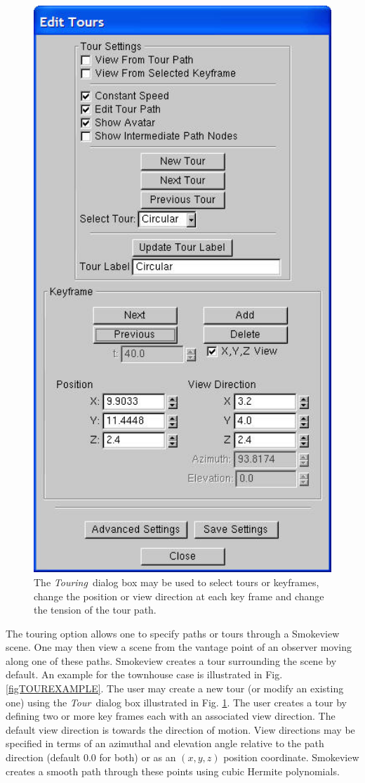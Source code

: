 \documentclass[11pt,twoside]{book}
\begin{document}
\begin{figure}[\figoptions]
\begin{center}
\includegraphics[width=4.4722222in]{FIGURES/figTOUR}
\end{center}
\caption[{\em Touring}\ dialog box.]{The {\em Touring}\ dialog
box may be used to select tours or keyframes, change the
position or view direction at each key frame and change the tension
of the tour path. }
 \label{figTOUR}
\end{figure}

The touring option allows one to specify paths or tours through a
Smokeview scene.  One may then view a scene from the vantage point of an
observer moving along one of these paths. Smokeview creates a tour surrounding
the scene by default.  An example for the townhouse case is illustrated
in Fig. \ref{figTOUREXAMPLE}.
The user may create a new tour (or modify an existing one) using the {\em Tour}\
dialog box illustrated in Fig. \ref{figTOUR}. The user creates a tour by
defining two or more key frames each with an associated view direction.
The default view direction is towards the direction of
motion.  View directions may be specified in terms of an azimuthal and
elevation angle relative to the path direction (default 0.0 for both)
or as an $(x,y,z)$ position coordinate.  Smokeview creates a smooth
path through these points using cubic Hermite polynomials.
\end{document}
